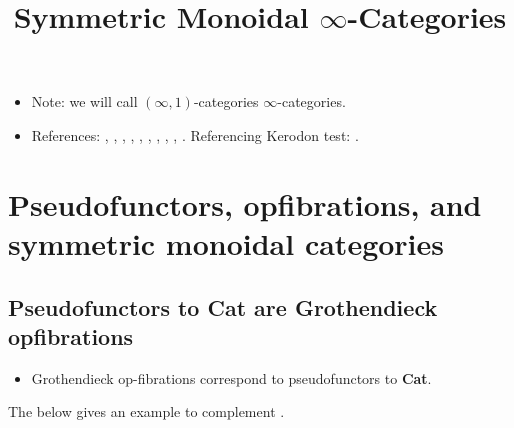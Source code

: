 \documentclass{MetricNotes2023}
\title{Symmetric Monoidal \(\infty\)-Categories}
\date{\vspace{-5ex}}
\begin{document}
\maketitle
%

\DeclarePairedDelimiter{\norm}{\lVert}{\rVert} 
\DeclarePairedDelimiter{\abs}{\lvert}{\rvert} 
\DeclarePairedDelimiter{\ang}{\langle}{\rangle} 

\begin{itemize}
\item Note: we will call \((\infty, 1)\)-categories \(\infty\)-categories. 
\item References:
\autocite{goodfibrations}, \autocite{categorical},  \autocite{symmetricmonoidal}, \autocite{groth2015short}, \autocite{2dimensional},  \autocite{fibrational_notions},  \autocite{higheralgebra}, \autocite{lurie2008higher}, \autocite{kerodon}, \autocite{monoidalgrothendieck}. Referencing Kerodon test: \cite[\href{https://kerodon.net/tag/01UB}{Example 01UB}]{kerodon}. 
\end{itemize}

\section{Pseudofunctors, opfibrations, and symmetric monoidal categories}

\subsection{Pseudofunctors to \textbf{Cat} are Grothendieck opfibrations}

\begin{itemize}
\item Grothendieck op-fibrations correspond to pseudofunctors to \textbf{Cat}.
\end{itemize}

The below gives an example to complement \autocite{symmetricmonoidal}.
\end{document}
